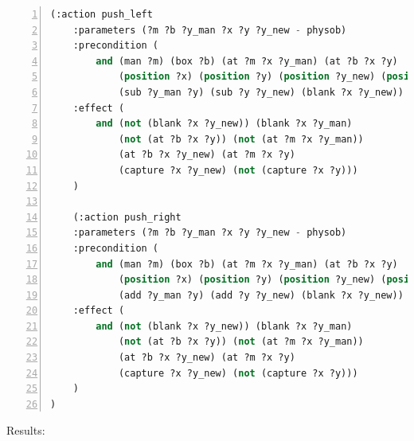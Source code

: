 \documentclass[a4paper, 11pt]{article}
\begin{document}
\begin{lstlisting}[title=boxman.pddl,frame=single,language=lisp,numbers=left]
    (:action push_left
    :parameters (?m ?b ?y_man ?x ?y ?y_new - physob)
    :precondition (
        and (man ?m) (box ?b) (at ?m ?x ?y_man) (at ?b ?x ?y)
            (position ?x) (position ?y) (position ?y_new) (position ?y_man)
    	    (sub ?y_man ?y) (sub ?y ?y_new) (blank ?x ?y_new))
    :effect (
        and (not (blank ?x ?y_new)) (blank ?x ?y_man)
            (not (at ?b ?x ?y)) (not (at ?m ?x ?y_man))
            (at ?b ?x ?y_new) (at ?m ?x ?y)
            (capture ?x ?y_new) (not (capture ?x ?y)))
    )

    (:action push_right
    :parameters (?m ?b ?y_man ?x ?y ?y_new - physob)
    :precondition (
        and (man ?m) (box ?b) (at ?m ?x ?y_man) (at ?b ?x ?y)
            (position ?x) (position ?y) (position ?y_new) (position ?y_man)
    	    (add ?y_man ?y) (add ?y ?y_new) (blank ?x ?y_new))
    :effect (
        and (not (blank ?x ?y_new)) (blank ?x ?y_man)
            (not (at ?b ?x ?y)) (not (at ?m ?x ?y_man))
            (at ?b ?x ?y_new) (at ?m ?x ?y)
            (capture ?x ?y_new) (not (capture ?x ?y)))
    )
)

\end{lstlisting}

Results:
\end{document}
